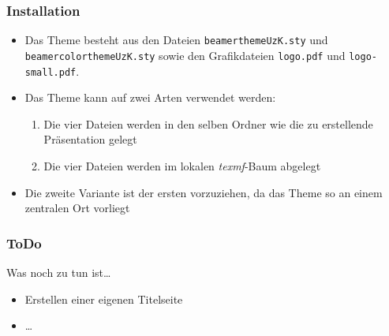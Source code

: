 \documentclass[9pt]{beamer}
\begin{document}
\begin{frame}
  \frametitle{Installation}
  \begin{itemize}
  \item Das Theme besteht aus den Dateien
    \texttt{beamerthemeUzK.sty} und \texttt{beamercolorthemeUzK.sty}
    sowie den Grafikdateien \texttt{logo.pdf} und
    \texttt{logo-small.pdf}.
  \item Das Theme kann auf zwei Arten verwendet werden:
    \begin{enumerate}
    \item Die vier Dateien werden in den selben Ordner wie die zu
      erstellende Präsentation gelegt
    \item Die vier Dateien werden im lokalen \emph{texmf}-Baum abgelegt
    \end{enumerate}
  \item Die zweite Variante ist der ersten vorzuziehen, da das Theme
    so an einem zentralen Ort vorliegt
  \end{itemize}
\end{frame}


\begin{frame}
  \frametitle{ToDo}

  \begin{block}{Was noch zu tun ist\ldots}
    \begin{itemize}
    \item Erstellen einer eigenen Titelseite
    \item \ldots
    \end{itemize}
  \end{block}

\end{frame}
\end{document}
